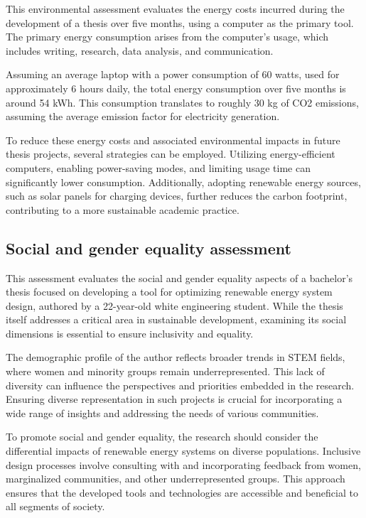 \documentclass[a4paper,11pt, titlepage, twoside]{article}
\begin{document}
This environmental assessment evaluates the energy costs incurred during
the development of a thesis over five months, using a computer as the primary tool. The primary energy consumption arises
from the computer's usage, which includes writing, research, data analysis, and communication.\par

Assuming an average laptop with a power consumption of 60 watts, used for approximately 6 hours daily, the total energy consumption
over five months is around 54 kWh. This consumption translates to roughly 30 kg of CO2 emissions, assuming the average emission
factor for electricity generation.\par

To reduce these energy costs and associated environmental impacts in future thesis projects, several strategies can be employed.
Utilizing energy-efficient computers, enabling power-saving modes, and limiting usage time can significantly lower consumption.
Additionally, adopting renewable energy sources, such as solar panels for charging devices, further reduces the carbon footprint,
contributing to a more sustainable academic practice.

\subsection{Social and gender equality assessment}

This assessment evaluates the social and gender equality aspects of a bachelor's thesis focused on developing a tool for optimizing renewable energy system design, authored by a 22-year-old white engineering student. While the thesis itself addresses a critical area in sustainable development, examining its social dimensions is essential to ensure inclusivity and equality.

The demographic profile of the author reflects broader trends in STEM fields, where women and minority groups remain underrepresented. This lack of diversity can influence the perspectives and priorities embedded in the research. Ensuring diverse representation in such projects is crucial for incorporating a wide range of insights and addressing the needs of various communities.

To promote social and gender equality, the research should consider the differential impacts of renewable energy systems on diverse populations. Inclusive design processes involve consulting with and incorporating feedback from women, marginalized communities, and other underrepresented groups. This approach ensures that the developed tools and technologies are accessible and beneficial to all segments of society.
\end{document}

